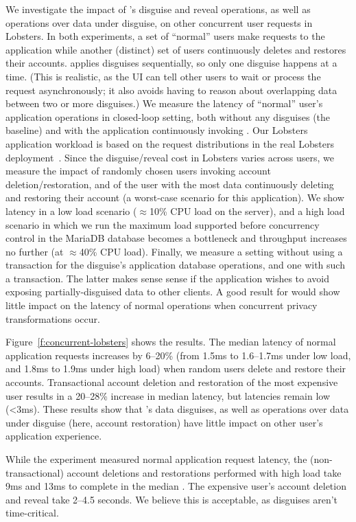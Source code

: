 %
We investigate the impact of \sys's disguise and reveal operations, as well as
operations over data under disguise, on other concurrent user requests in Lobsters.
%
In both experiments, a set of ``normal'' users make requests to the application
while another (distinct) set of users continuously deletes and restores their
accounts.
%
\sys applies disguises sequentially, so only one disguise happens at a time.
%
(This is realistic, as the UI can tell other users to wait or process the request
asynchronously; it also avoids \sys having to reason about overlapping data between
two or more disguises.)
%
We measure the latency of ``normal'' user's application operations in closed-loop
setting, both without any disguises (the baseline) and with the application
continuously invoking \sys.
%
Our Lobsters application workload is based on the request distributions in the real
Lobsters deployment~\cite{lobsters-data}.
%
Since the disguise/reveal cost in Lobsters varies across users, we measure the
impact of randomly chosen users invoking account deletion/restoration, and of
the user with the most data continuously deleting and restoring their account
(a worst-case scenario for this application).
%
We show latency in a low load scenario ($\approx$10\% CPU load on the server),
and a high load scenario in which we run the maximum load supported before
concurrency control in the MariaDB database becomes a bottleneck
and throughput increases no further (at $\approx$40\% CPU load).
%
Finally, we measure a setting without using a transaction for the disguise's
application database operations, and one with such a transaction.
%
The latter makes sense sense if the application wishes to avoid exposing
partially-disguised data to other clients.
%
A good result for \sys would show little impact on the latency of normal operations
when concurrent privacy transformations occur.
%

%
Figure~\ref{f:concurrent-lobsters} shows the results.
%
The median latency of normal application requests increases by 6--20\% (from
1.5ms to 1.6--1.7ms under low load, and 1.8ms to 1.9ms under high load) when
random users delete and restore their accounts.
%
Transactional account deletion and restoration of the most expensive user
results in a 20--28\% increase in median latency, but latencies remain low (<3ms).
These results show that \sys's data disguises, as well as operations over data under disguise (here, account restoration) have little impact on other user's application experience.
%

%
While the experiment measured normal application request latency, the (non-transactional) account
deletions and restorations performed with high load take 9ms and 13ms to complete in the median
.
%
The expensive user's account deletion and reveal take 2--4.5 seconds.
%
We believe this is acceptable, as disguises aren't time-critical.
%
